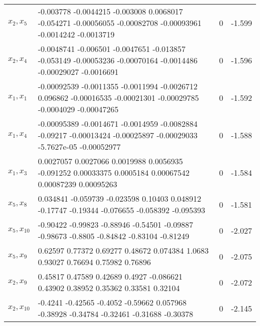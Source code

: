 \begin{tabular}{llll}
$x_2,x_5$ & -0.003778  -0.0044215   -0.003008   0.0068017   -0.054271 -0.00056055 -0.00082708 -0.00093961  -0.0014242  -0.0013719 & 0 & -1.599 \\ 
$x_2,x_4$ & -0.0048741   -0.006501  -0.0047651   -0.013857   -0.053149 -0.00053236 -0.00070164  -0.0014486 -0.00029027  -0.0016691 & 0 & -1.596 \\ 
$x_1,x_1$ & -0.00092539  -0.0011355  -0.0011994  -0.0026712    0.096862 -0.00016535 -0.00021301 -0.00029785  -0.0004029 -0.00047265 & 0 & -1.592 \\ 
$x_1,x_4$ & -0.00095389  -0.0014671  -0.0014959  -0.0082884    -0.09217 -0.00013424 -0.00025897 -0.00029033 -5.7627e-05 -0.00052977 & 0 & -1.588 \\ 
$x_1,x_3$ & 0.0027057   0.0027066   0.0019988   0.0056935   -0.091252  0.00033375   0.0005184  0.00067542  0.00087239  0.00095263 & 0 & -1.584 \\ 
$x_5,x_8$ & 0.034841   -0.059739   -0.023598     0.10403    0.048912    -0.17747    -0.19344   -0.076655   -0.058392   -0.095393 & 0 & -1.581 \\ 
$x_5,x_10$ & -0.90422    -0.99823    -0.88946    -0.54501    -0.09887    -0.98673     -0.8805    -0.84842    -0.83104    -0.81249 & 0 & -2.027 \\ 
$x_5,x_9$ & 0.62597     0.77372     0.69277     0.48672    0.074384      1.0683     0.93027     0.76694     0.75982     0.76896 & 0 & -2.075 \\ 
$x_2,x_9$ & 0.45817     0.47589     0.42689      0.4927   -0.086621     0.43902     0.38952     0.35362     0.33581     0.32104 & 0 & -2.072 \\ 
$x_2,x_10$ & -0.4241    -0.42565     -0.4052    -0.59662    0.057968    -0.38928    -0.34784    -0.32461    -0.31688    -0.30378 & 0 & -2.145 \\ 
\hline 
\end{tabular}